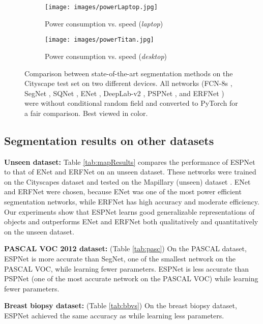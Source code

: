 \documentclass[runningheads]{llncs}
\begin{document}
\begin{figure}[t!]
\begin{subfigure}[b]{0.48\columnwidth}
\end{subfigure}
\vspace{2mm}
\begin{subfigure}[b]{0.48\columnwidth}
\centering
\texttt{[image: images/powerLaptop.jpg]}
\caption{Power consumption vs. speed (\textit{laptop})}
\label{fig:powerLap}
\end{subfigure}
\hfill
\begin{subfigure}[b]{0.5\columnwidth}
\centering
\texttt{[image: images/powerTitan.jpg]}
\caption{Power consumption vs. speed (\textit{desktop})}
\label{fig:powerDesk}
\end{subfigure}
\caption{Comparison between state-of-the-art segmentation methods on the Cityscape test set on two different devices. All networks (FCN-8s \cite{long2015fully}, SegNet \cite{badrinarayanan2017segnet}, SQNet \cite{treml2016speeding}, ENet \cite{paszke2016enet}, DeepLab-v2 \cite{chen2016deeplab}, PSPNet \cite{zhao2017pyramid}, and ERFNet \cite{romera2018erfnet}) were without conditional random field and converted to PyTorch for a fair comparison. Best viewed in color.}
\label{fig:compareSt}
\end{figure}

\subsection{Segmentation results on other datasets}
\label{ssec:mapillary}
\noindent \textbf{Unseen dataset:} Table \ref{tab:mapResults} compares the performance of ESPNet to that of ENet \cite{paszke2016enet} and ERFNet \cite{romera2018erfnet} on an unseen dataset. These networks were trained on the Cityscapes dataset \cite{cordts2016cityscapes} and tested on the Mapillary (unseen) dataset \cite{MVD2017}. ENet and ERFNet were chosen, because ENet was one of the most power efficient segmentation networks, while ERFNet has high accuracy and moderate efficiency. Our experiments show that ESPNet learns good generalizable representations of objects and outperforms ENet and ERFNet both qualitatively and quantitatively on the unseen dataset.

\noindent \textbf{PASCAL VOC 2012 dataset:} (Table \ref{tab:pasc}) On the PASCAL dataset, ESPNet is  more accurate than SegNet, one of the smallest network on the PASCAL VOC, while learning  fewer parameters. ESPNet is  less accurate than PSPNet (one of the most accurate network on the PASCAL VOC) while learning  fewer parameters.

\noindent \textbf{Breast biopsy dataset:} (Table \ref{tab:bbvs}) On the breast biopsy  dataset, ESPNet achieved the same accuracy as \cite{mehta2017learning} while learning  less parameters.
\end{document}
